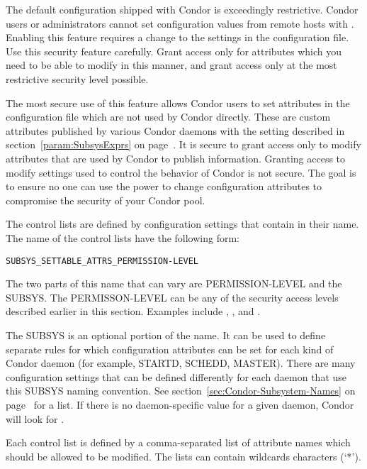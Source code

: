 The default configuration shipped with Condor is exceedingly
restrictive.
Condor users or administrators cannot set
configuration values from remote hosts with .
Enabling this feature requires a change to the
settings in the configuration file.
Use this security feature carefully.
Grant access only for attributes which you need to be able to modify
in this manner, and grant access only at the most restrictive
security level possible.

The most secure use of this feature allows Condor users to set
attributes in the configuration file which are not used by Condor
directly.
These are custom attributes published by various Condor
daemons with the  setting described in
section~\ref{param:SubsysExprs} on page~\pageref{param:SubsysExprs}.
It is secure to grant access only to modify attributes that are used by Condor
to publish information.
Granting access to modify
settings used to control the behavior of Condor is
not secure.
The goal is to
ensure no
one can use the power to change configuration attributes to compromise 
the security of your Condor pool.

The control lists are defined by configuration settings that contain 
 in their name.
The name of the control lists have the following form: 

\begin{verbatim}
SUBSYS_SETTABLE_ATTRS_PERMISSION-LEVEL
\end{verbatim}

The two parts of this name that can vary are
PERMISSION-LEVEL and the SUBSYS.
The PERMISSON-LEVEL can be any of the security access levels
described earlier in this section.
Examples include , , and .

The SUBSYS is an optional portion of the name. 
It can be used to
define separate rules for which configuration attributes can be set
for each kind of Condor daemon (for example, STARTD, SCHEDD, MASTER).
There are many configuration settings that can be defined differently
for each daemon that use this SUBSYS naming convention.
See section~\ref{sec:Condor-Subsystem-Names} on
page~\pageref{sec:Condor-Subsystem-Names} for a list.
If there is no daemon-specific value for a given daemon, Condor will
look for .

Each control list is defined by a comma-separated list of attribute
names which should be allowed to be modified.
The lists can contain wildcards characters (`*'). 

